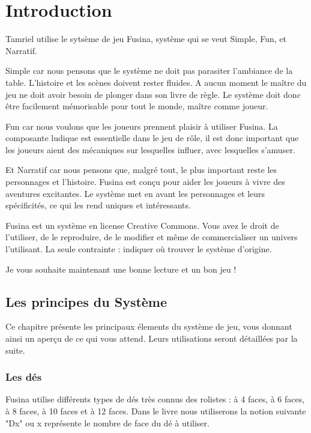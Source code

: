 \chapter{Introduction}

Tamriel utilise le sytsème de jeu Fusina, système qui se veut Simple, Fun, et Narratif.

Simple car nous pensons que le système ne doit pas parasiter l'ambiance de la table. L'histoire et les scènes doivent rester fluides. A aucun moment le maître du jeu ne doit avoir besoin de plonger dans son livre de règle. Le système doit donc être facilement mémorisable pour tout le monde, maître comme joueur.

Fun car nous voulons que les joueurs prennent plaisir à utiliser Fusina. La composante ludique est essentielle dans le jeu de rôle, il est donc important que les joueurs aient des mécaniques sur lesquelles influer, avec lesquelles s'amuser.

Et Narratif car nous pensons que, malgré tout, le plus important reste les personnages et l'histoire. Fusina est conçu pour aider les joueurs à vivre des aventures excitantes. Le système met en avant les personnages et leurs spécificités, ce qui les rend uniques et intéressants.

Fusina est un système en license Creative Commons. Vous avez le droit de l'utiliser, de le reproduire, de le modifier et même de commercialiser un univers l'utilisant. La seule contrainte : indiquer où trouver le système d'origine.

Je vous souhaite maintenant une bonne lecture et un bon jeu !

\section{Les principes du Système}

Ce chapitre présente les principaux élements du système de jeu, vous donnant ainsi un aperçu de ce qui vous attend. Leurs utilisations seront détaillées par la suite.

\subsection{Les dés}

Fusina utilise différents types de dés très connus des rolistes : à 4 faces, à 6 faces, à 8 faces, à 10 faces et à 12 faces. Dans le livre nous utiliserons la notion suivante "Dx" ou x représente le nombre de face du dé à utiliser. 

